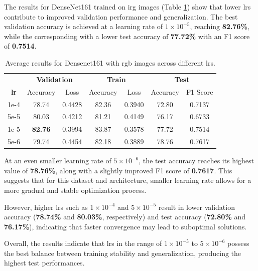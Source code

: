 The results for DenseNet161 trained on \gls{irg} images (Table \ref{tab:densenet161_irg}) show 
that lower \glspl{lr} contribute to improved validation performance 
and generalization. The best validation accuracy is achieved at a learning rate of 
$1\times10^{-5}$, reaching \textbf{82.76\%}, while the corresponding with a lower test accuracy 
of \textbf{77.72\%} with an F1 score of \textbf{0.7514}. 

\begin{table}[h]
    \centering
    \renewcommand{\arraystretch}{1.3}
    \setlength{\tabcolsep}{8pt}
    \begin{tabular}{|c|cccccc|}
        \hline
        & \multicolumn{2}{c}{\textbf{Validation}} & \multicolumn{2}{c}{\textbf{Train}} & \multicolumn{2}{c|}{\textbf{Test}} \\
        \textbf{\gls{lr}} & Accuracy & Loss & Accuracy & Loss & Accuracy & F1 Score \\
        \hline
        1e-4  & 78.74           & 0.4428 & 82.36 & 0.3940 & 72.80 & 0.7137 \\
        5e-5  & 80.03           & 0.4212 & 81.21 & 0.4149 & 76.17 & 0.6733 \\
        1e-5  & \textbf{82.76}  & 0.3994 & 83.87 & 0.3578 & 77.72 & 0.7514 \\
        5e-6  & 79.74           & 0.4454 & 82.18 & 0.3889 & 78.76 & 0.7617 \\
        \hline
    \end{tabular}
    \caption{Average results for Densenet161 with \gls{rgb} images across different \glspl{lr}.}
    \label{tab:densenet161_irg}
\end{table}

At an even smaller learning rate of $5\times10^{-6}$, the test accuracy reaches 
its highest value of \textbf{78.76\%}, along with a slightly improved F1 score of 
\textbf{0.7617}. This suggests that for this dataset and architecture, smaller learning rate allows 
for a more gradual and stable optimization process. 

However, higher \glspl{lr} such as $1\times10^{-4}$ and $5\times10^{-5}$ result 
in lower validation accuracy (\textbf{78.74\%} and \textbf{80.03\%}, respectively) and 
test accuracy (\textbf{72.80\%} and \textbf{76.17\%}), indicating that faster convergence 
may lead to suboptimal solutions.

Overall, the results indicate that \glspl{lr} in the range of $1\times10^{-5}$ to $5\times10^{-6}$ 
possess the best balance between training stability and generalization, producing the highest 
test performances.

